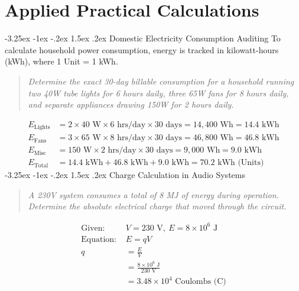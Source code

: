 \documentclass[11pt,a4paper]{report}
\makeatletter
\renewcommand{\section}{\@startsection{section}{1}{\z@}%
  {-3.25ex \@plus -1ex \@minus -.2ex}%
  {1.5ex \@plus.2ex}%
  {\normalfont\Large\bfseries\color{primaryColor}}}
\makeatother
\begin{document}
\chapter{Applied Practical Calculations}
\section{Domestic Electricity Consumption Auditing}
To calculate household power consumption, energy is tracked in kilowatt-hours (kWh), where 1 Unit = 1 kWh.
\begin{quote}\textit{Determine the exact 30-day billable consumption for a household running two 40W tube lights for 6 hours daily, three 65W fans for 8 hours daily, and separate appliances drawing 150W for 2 hours daily.}\end{quote}
\begin{align*}
E_{\text{Lights}} &= 2 \times 40\text{ W} \times 6\text{ hrs/day} \times 30\text{ days} = 14{,}400\text{ Wh} = 14.4\text{ kWh} \\
E_{\text{Fans}}   &= 3 \times 65\text{ W} \times 8\text{ hrs/day} \times 30\text{ days} = 46{,}800\text{ Wh} = 46.8\text{ kWh} \\
E_{\text{Misc}}   &= 150\text{ W} \times 2\text{ hrs/day} \times 30\text{ days} = 9{,}000\text{ Wh} = 9.0\text{ kWh} \\
E_{\text{Total}}  &= 14.4\text{ kWh} + 46.8\text{ kWh} + 9.0\text{ kWh} = 70.2\text{ kWh (Units)}
\end{align*}
\section{Charge Calculation in Audio Systems}
\begin{quote}\textit{A 230V system consumes a total of 8 MJ of energy during operation. Determine the absolute electrical charge that moved through the circuit.}\end{quote}
\begin{align*}
\text{Given: } &V = 230\text{ V}, \ E = 8 \times 10^6\text{ J} \\
\text{Equation: } &E = qV \\
q &= \frac{E}{V} \\
  &= \frac{8 \times 10^6\text{ J}}{230\text{ V}} \\
  &= 3.48 \times 10^4\text{ Coulombs (C)}
\end{align*}
\end{document}

